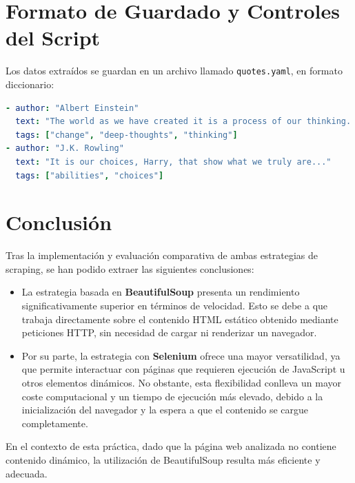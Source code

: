 \documentclass[a4paper,12pt]{article}
\begin{document}
\section{Formato de Guardado y Controles del Script}
Los datos extraídos se guardan en un archivo llamado \texttt{quotes.yaml}, en formato diccionario:

\begin{lstlisting}[language=yaml]
- author: "Albert Einstein"
  text: "The world as we have created it is a process of our thinking..."
  tags: ["change", "deep-thoughts", "thinking"]
- author: "J.K. Rowling"
  text: "It is our choices, Harry, that show what we truly are..."
  tags: ["abilities", "choices"]
\end{lstlisting}


\section{Conclusión}

Tras la implementación y evaluación comparativa de ambas estrategias de scraping, se han podido extraer las siguientes conclusiones:

\begin{itemize}
    \item La estrategia basada en \textbf{BeautifulSoup} presenta un rendimiento significativamente superior en términos de velocidad. Esto se debe a que trabaja directamente sobre el contenido HTML estático obtenido mediante peticiones HTTP, sin necesidad de cargar ni renderizar un navegador.
    
    \item Por su parte, la estrategia con \textbf{Selenium} ofrece una mayor versatilidad, ya que permite interactuar con páginas que requieren ejecución de JavaScript u otros elementos dinámicos. No obstante, esta flexibilidad conlleva un mayor coste computacional y un tiempo de ejecución más elevado, debido a la inicialización del navegador y la espera a que el contenido se cargue completamente.
\end{itemize}

En el contexto de esta práctica, dado que la página web analizada no contiene contenido dinámico, la utilización de BeautifulSoup resulta más eficiente y adecuada.
\end{document}

